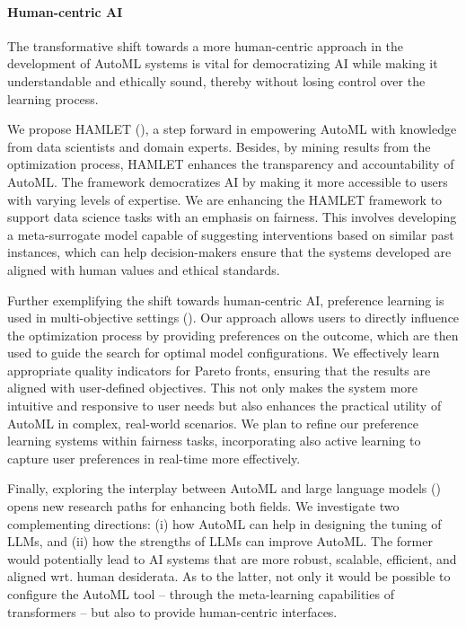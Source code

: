\paragraph{Human-centric AI}
The transformative shift towards a more human-centric approach in the development of AutoML systems is vital for democratizing AI while making it understandable and ethically sound, thereby without losing control over the learning process.

We propose HAMLET (), a step forward in empowering AutoML with knowledge from data scientists and domain experts.
Besides, by mining results from the optimization process, HAMLET enhances the transparency and accountability of AutoML.
The framework democratizes AI by making it more accessible to users with varying levels of expertise.
We are enhancing the HAMLET framework to support data science tasks with an emphasis on fairness.
This involves developing a meta-surrogate model capable of suggesting interventions based on similar past instances, which can help decision-makers ensure that the systems developed are aligned with human values and ethical standards.

Further exemplifying the shift towards human-centric AI, preference learning is used in multi-objective settings ().
Our approach allows users to directly influence the optimization process by providing preferences on the outcome, which are then used to guide the search for optimal model configurations.
We effectively learn appropriate quality indicators for Pareto fronts, ensuring that the results are aligned with user-defined objectives.
This not only makes the system more intuitive and responsive to user needs but also enhances the practical utility of AutoML in complex, real-world scenarios.
We plan to refine our preference learning systems within fairness tasks, incorporating also active learning to capture user preferences in real-time more effectively.

Finally, exploring the interplay between AutoML and large language models () opens new research paths for enhancing both fields.
We investigate two complementing directions: (i) how AutoML can help in designing the tuning of LLMs, and (ii) how the strengths of LLMs can improve AutoML.
The former would potentially lead to AI systems that are more robust, scalable, efficient, and aligned wrt. human desiderata.
As to the latter, not only it would be possible to configure the AutoML tool -- through the meta-learning capabilities of transformers -- but also to provide human-centric interfaces.

